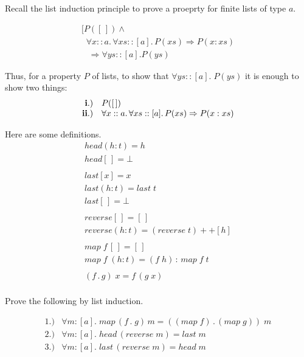 \documentclass[11pt]{article}
\begin{document}

Recall the list induction principle to prove a proeprty for finite lists of type $a$.

\[\begin{array}{l}

[P([\,]) \wedge \\
\;\;\forall{}x::a.\,\forall xs::[a].\, P(xs) \Rightarrow P(x:xs) \\
\;\;\; \Rightarrow \forall{}ys::[a]. P(ys)
\end{array}\]

Thus, for a property $P$ of lists, to show that $\forall{}ys::[a].\; P(ys)$ it
is enough to show two things:
\[\begin{array}{rl}
{\bf{i.)}} & P([\,]) \\
{\bf{ii.)}} & \forall x::a.\,\forall{}xs::[a].\, P(xs) \Rightarrow P(x:xs)\\
\end{array}\]

Here are some definitions.
\[\begin{array}{l}

head (h:t) = h \\
head [\,] = \bot \\
\ \\
last [x] = x \\
last (h:t) = last \; t \\
last [\,] = \bot \\
\ \\
reverse [\,] = [\,]\\
reverse (h:t) = (reverse \; t ) ++ [h] \\
\ \\
map\; f\, [\,] = [\,] \\
map \; f \; (h:t) = (f\; h)\, :\, map \; f \; t \\
\ \\
(f\, .\, g)\; x = f\, (g\; x)\\

\end{array}\]


Prove the following by list induction.

\[\begin{array}{ll}
1.) & \forall{}m \!:\![a].\; map \,(f\, .\; g)\, m = ((map\; f)\, .\, (map\; g))\; m\\
2.) & \forall{}m \!:\![a].\; head\, (reverse \; m) = last \; m \\
3.) & \forall{}m \!:\![a].\; last\, (reverse \; m) = head \; m
\end{array}
\]
\end{document}
